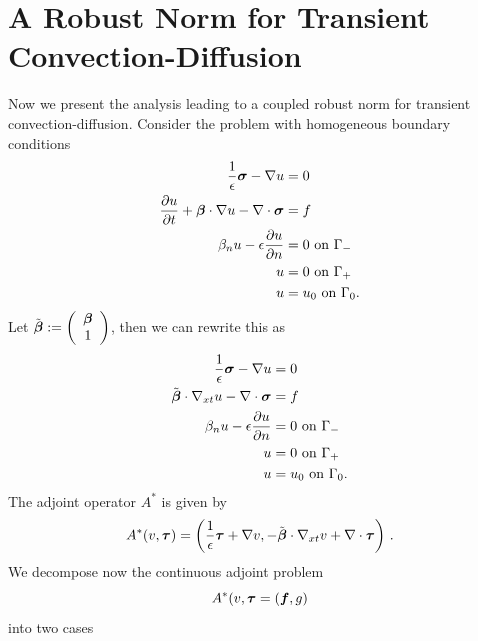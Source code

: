 \documentclass{article}
\begin{document}
\section{A Robust Norm for Transient Convection-Diffusion}
Now we present the analysis leading to a coupled robust norm for transient convection-diffusion.
Consider the problem with homogeneous boundary conditions
\begin{align*}
\frac{1}{\epsilon}\boldsymbol\sigma-\nabla u &=0\\
\frac{\partial u}{\partial t} + \boldsymbol\beta\cdot\nabla u - \nabla\cdot\boldsymbol\sigma &= f\\
\beta_n u-\epsilon\frac{\partial u}{\partial n} &= 0 \text{ on } \Gamma_-\\
u &= 0 \text{ on } \Gamma_+\\
u &= u_0 \text{ on } \Gamma_0.
\end{align*}
Let $\tilde{\boldsymbol\beta}:=\left( \begin{array}{c} \boldsymbol\beta\\ 1\\ \end{array} \right)$, then we can rewrite this as
\begin{align*}
\frac{1}{\epsilon}\boldsymbol\sigma-\nabla u &=0\\
\tilde{\boldsymbol\beta}\cdot\nabla_{xt} u - \nabla\cdot\boldsymbol\sigma &= f\\
\beta_n u-\epsilon\frac{\partial u}{\partial n} &= 0 \text{ on } \Gamma_-\\
u &= 0 \text{ on } \Gamma_+\\
u &= u_0 \text{ on } \Gamma_0.
\end{align*}
The adjoint operator $A^*$ is given by 
\[
A^*(v,\boldsymbol\tau)=\left( \frac{1}{\epsilon}\boldsymbol\tau+\nabla v,-\tilde{\boldsymbol\beta}\cdot\nabla_{xt} v+\nabla\cdot\boldsymbol\tau \right)\,.
\]
We decompose now the continuous adjoint problem
\[
A^*(v,\boldsymbol\tau=(\boldsymbol f,g)
\]
into two cases
\end{document}

